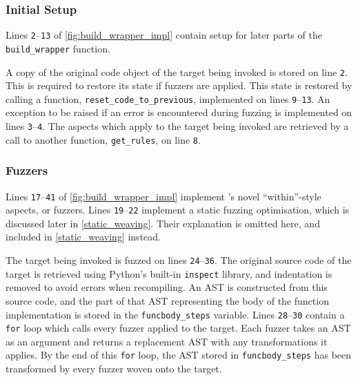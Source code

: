 \subsubsection{Initial Setup}
Lines \texttt{2}--\texttt{13} of \cref{fig:build_wrapper_impl} contain setup for
later parts of the \lstinline{build_wrapper} function.

A copy of the original code object of the target being invoked is stored on line
\texttt{2}. This is required to restore its state if fuzzers are applied. This
state is restored by calling a function, \lstinline{reset_code_to_previous},
implemented on lines \texttt{9}--\texttt{13}. An exception to be raised if an
error is encountered during fuzzing is implemented on lines
\texttt{3}--\texttt{4}. The aspects which apply to the target being invoked are
retrieved by a call to another function, \lstinline{get_rules}, on line
\texttt{8}. 

\subsubsection{Fuzzers}

Lines \texttt{17}--\texttt{41} of \cref{fig:build_wrapper_impl} implement
\pdsf{}'s novel ``within''-style aspects, or fuzzers. 
Lines \texttt{19}--\texttt{22} implement a static fuzzing optimisation, which is
discussed later in \cref{static_weaving}. Their explanation is omitted here, and
included in \cref{static_weaving} instead.

The target being invoked is fuzzed on lines \texttt{24}--\texttt{36}. The
original source code of the target is retrieved using Python's built-in
\lstinline{inspect} library, and indentation is removed to avoid errors when
recompiling. An AST is constructed from this source code, and the part of that
AST representing the body of the function implementation is stored in the
\lstinline{funcbody_steps} variable. Lines \texttt{28}--\texttt{30} contain a
\lstinline{for} loop which calls every fuzzer applied to the target. Each fuzzer
takes an AST as an argument and returns a replacement AST with any
transformations it applies. By the end of this \lstinline{for} loop, the AST
stored in \lstinline{funcbody_steps} has been transformed by every fuzzer woven
onto the target.

